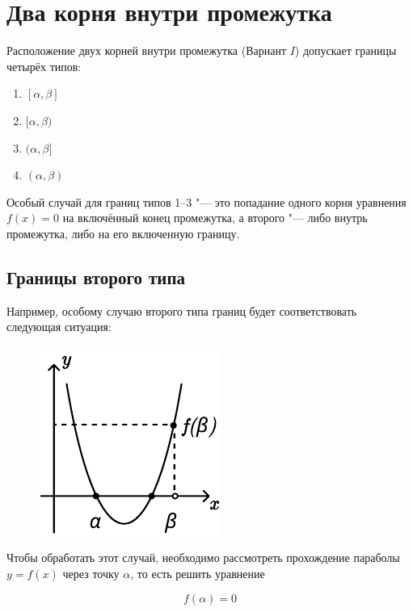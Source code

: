\section {Два корня внутри промежутка}

Расположение двух корней внутри промежутка (Вариант $I$) допускает границы четырёх типов:

\begin {enumerate} [labelindent=\parindent, leftmargin=*]
    \item {$[\alpha, \beta]$}
    \item {$[\alpha, \beta)$}
    \item {$(\alpha, \beta]$}
    \item {$(\alpha, \beta)$}
\end {enumerate}

Особый случай для границ типов 1--3 "--- это попадание одного корня уравнения $f(x) = 0$ на
включённый конец промежутка, а второго "--- либо внутрь промежутка, либо на его включенную границу.

\subsection {Границы второго типа}

Например, особому случаю второго типа границ будет соответствовать следующая ситуация:

\begin {figure} [h]
    \begin {minipage} [t] {\linewidth}
        \centering
        \includegraphics [width=0.3\linewidth] {image/image_01.pdf}
    \end {minipage}
\end {figure}

Чтобы обработать этот случай, необходимо рассмотреть прохождение параболы $y = f(x)$ через точку
$\alpha$, то есть решить уравнение

\begin {equation*}
    f(\alpha) = 0
\end {equation*}

